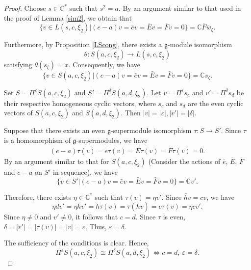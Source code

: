 \documentclass[a4paper,10pt]{article}
\theoremstyle{definition}
\theoremstyle{plain}
\theoremstyle{remark}
\theoremstyle{mystyle}
\numberwithin{equation}{section}
\begin{document}
\begin{proof}
    Choose $s\in \mathbb C^*$ such that $s^2=a$. By an argument similar to that used in the proof of Lemma \ref{sim2}, we obtain that 
    $$
    \{v\in L(s,c,\xi_2)|(e-a)v=\bar ev=\bar Ev=\bar Fv=0\}=\mathbb C\bar F\bar w_{\zeta}.
    $$

    Furthermore, by Proposition \ref{LScong}, there exists a $\mathfrak g$-module isomorphism
    $$
    \theta :S(a,c,\xi_2)\to L(s,c,\xi_2)
    $$
    satisfying $\theta(s_{\zeta})=x$. Consequently, we have
    $$
    \{v\in S(a,c,\xi_2)|(e-a)v=\bar ev=\bar Ev=\bar Fv=0\}=\mathbb Cs_{\zeta}.
    $$

    Set $S=\Pi^{\varepsilon}S(a,c,\xi_2)$ and $S'=\Pi^{\delta}S(a,d,\xi_2)$. Let $v=\Pi^{\varepsilon}s_c$ and $v'=\Pi^{\delta}s_d$ be their respective homogeneous cyclic vectors, where $s_c$ and $s_d$ are the even cyclic vectors of $S(a,c,\xi_2)$ and $S(a,d,\xi_2)$. Then $|v|=|\varepsilon|,|v'|=|\delta|$.

    Suppose that there exists an even $\mathfrak g$-supermodule isomorphism $\tau:S\to S'.$ Since \(\tau\) is a homomorphism of \(\mathfrak g\)-supermodules, we have
    $$
    \begin{gathered}
        (e-a)\tau(v)=\bar e\tau(v)=\bar E\tau(v)=\bar F\tau(v)=0.
    \end{gathered}
    $$
    By an argument similar to that for $S(a,c,\xi_2)$ (Consider the actions of $\bar e$, $\bar E$, $\bar F$ and $e-a$ on $S'$ in sequence), we have
    $$
    \{v\in S'|(e-a)v=\bar ev=\bar Ev=\bar Fv=0\}=\mathbb Cv'.
    $$

    Therefore, there exists \(\eta\in\mathbb C^*\) such that 
    $\tau(v)=\eta v'$.
    Since $\bar hv=cv$, we have 
    $$
    \eta dv'=\eta \bar hv'=\bar h\tau(v)=\tau(\bar hv)=c\tau(v)=\eta cv'.
    $$
    Since \(\eta\ne0\) and \(v'\ne0\), it follows that $c=d$. Since \(\tau\) is even, $\delta=|v'|=|\tau(v)|=|v|=\varepsilon.$
    Thus, $\varepsilon=\delta$. 
    
    The sufficiency of the conditions is clear. Hence,
    $$
        \Pi^\varepsilon S(a,c,\xi_2)\cong\Pi^\delta S(a,d,\xi_2)\iff c=d,\ \varepsilon=\delta.
    $$
\end{proof}
\end{document}
